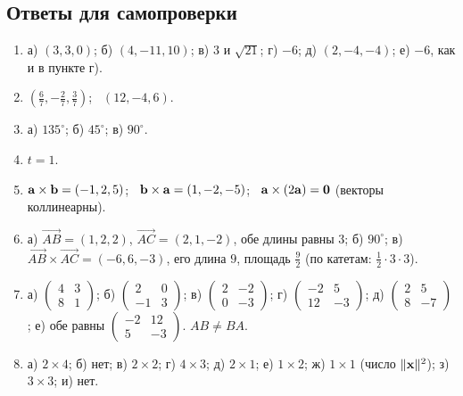 \subsection*{Ответы для самопроверки}
\begin{small}
\begin{enumerate}[label=\textbf{\arabic*.}, leftmargin=2em]
  \item а) $(3,3,0)$; б) $(4,-11,10)$; в) $3$ и $\sqrt{21}$; г) $-6$; д) $(2,-4,-4)$; е) $-6$, как и в пункте г).
  \item $\left(\frac67,-\frac27,\frac37\right)$; \ $(12,-4,6)$.
  \item а) $135^\circ$; б) $45^\circ$; в) $90^\circ$.
  \item $t=1$.
  \item $\mathbf{a}\times\mathbf{b}=(-1,2,5)$; \ $\mathbf{b}\times\mathbf{a}=(1,-2,-5)$; \ $\mathbf{a}\times(2\mathbf{a})=\mathbf{0}$ (векторы коллинеарны).
  \item а) $\overrightarrow{AB}=(1,2,2)$, $\overrightarrow{AC}=(2,1,-2)$, обе длины равны $3$; б) $90^\circ$; в) $\overrightarrow{AB}\times\overrightarrow{AC}=(-6,6,-3)$, его длина $9$, площадь $\frac92$ (по катетам: $\frac12\cdot3\cdot3$).
  \item а) $\begin{pmatrix}4&3\\8&1\end{pmatrix}$; б) $\begin{pmatrix}2&0\\-1&3\end{pmatrix}$; в) $\begin{pmatrix}2&-2\\0&-3\end{pmatrix}$; г) $\begin{pmatrix}-2&5\\12&-3\end{pmatrix}$; д) $\begin{pmatrix}2&5\\8&-7\end{pmatrix}$; е) обе равны $\begin{pmatrix}-2&12\\5&-3\end{pmatrix}$. $AB\ne BA$.
  \item а) $2\times4$; б) нет; в) $2\times2$; г) $4\times3$; д) $2\times1$; е) $1\times2$; ж) $1\times1$ (число $\lVert \mathbf{x}\rVert^2$); з) $3\times3$; и) нет.
\end{enumerate}
\end{small}

